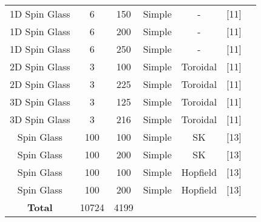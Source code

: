 \documentclass{standalone}
\begin{document}
\begin{tabular}{ |c|c|c|c|c|c|c| }
    1D Spin Glass & 6 & 150 & Simple & - & [11] \\
    1D Spin Glass & 6 & 200 & Simple & - & [11] \\
    1D Spin Glass & 6 & 250 & Simple & - & [11] \\
    2D Spin Glass & 3 & 100 & Simple & Toroidal & [11] \\
    2D Spin Glass & 3 & 225 & Simple & Toroidal & [11] \\
    3D Spin Glass & 3 & 125 & Simple & Toroidal & [11] \\
    3D Spin Glass & 3 & 216 & Simple & Toroidal & [11] \\
    Spin Glass & 100 & 100 & Simple & SK & [13] \\
    Spin Glass & 100 & 200 & Simple & SK & [13] \\
    Spin Glass & 100 & 100 & Simple & Hopfield & [13] \\
    Spin Glass & 100 & 200 & Simple & Hopfield & [13] \\
     \hline
    \textbf{Total} & 10724 & 4199 & & & \\
    \hline
\end{tabular}
\end{document}
